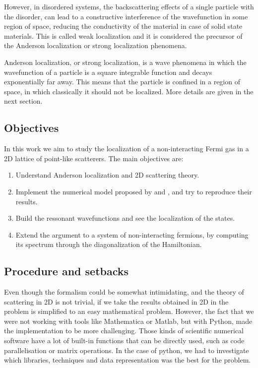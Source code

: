 However, in disordered systems, the backscattering effects of a single particle with the disorder, can lead to a constructive interference of the wavefunction in some region of space, reducing the conductivity of the material in case of solid state materials. This is called weak localization and it is considered the precursor of the Anderson localization or strong localization phenomena. 

Anderson localization, or strong localization, is a wave phenomena in which the wavefunction of a particle is a square integrable function and decays exponentially far away. This means that the particle is confined in a region of space, in which classically it should not be localized. More details are given in the next section.

\subsection{Objectives}

In this work we aim to study the localization of a non-interacting Fermi gas in a 2D lattice of point-like scatterers. The main objectives are:

\begin{enumerate}
    \item Understand Anderson localization and 2D scattering theory.
    \item Implement the numerical model proposed by \cite{massignanThreedimensional2006} and \cite{antezzaQuantitativeStudyTwo2010}, and try to reproduce their results.
    \item Build the ressonant wavefunctions and see the localization of the states.
    \item Extend the argument to a system of non-interacting fermions, by computing its spectrum through the diagonalization of the Hamiltonian.
\end{enumerate}

\subsection{Procedure and setbacks}

Even though the formalism could be somewhat intimidating, and the theory of scattering in 2D is not trivial, if we take the results obtained in 2D in \cite{antezzaQuantitativeStudyTwo2010} the problem is simplified to an easy mathematical problem. However, the fact that we were not working with tools like Mathematica or Matlab, but with Python, made the implementation to be more challenging. Those kinds of scientific numerical software have a lot of built-in functions that can be directly used, such as code parallelisation or matrix operations. In the case of python, we had to investigate which libraries, techniques and data representation was the best for the problem. 


